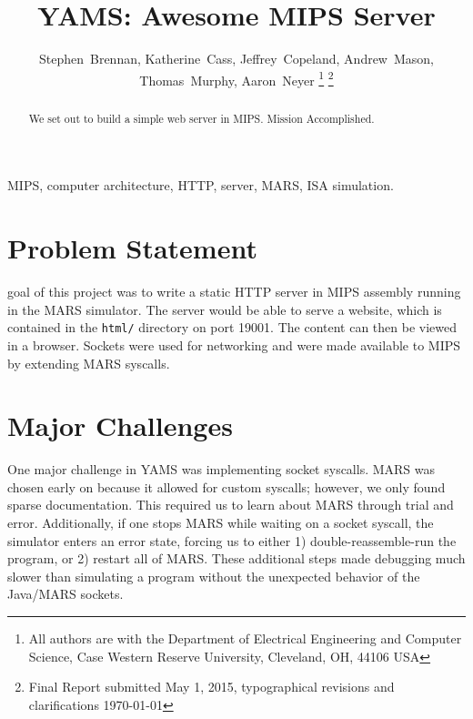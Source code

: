 \documentclass[journal,10pt]{IEEEtran}
\begin{document}
\title{YAMS: Awesome MIPS Server}

\author{
Stephen~Brennan,
Katherine~Cass,
Jeffrey~Copeland,
Andrew~Mason,
Thomas~Murphy,
Aaron~Neyer%
\thanks{All authors are with the Department of Electrical Engineering and Computer Science, Case Western Reserve University, Cleveland, OH, 44106 USA}%
\thanks{Final Report submitted May 1, 2015, typographical revisions and clarifications \today}
} %


%
{}

\maketitle

\begin{abstract}
We set out to build a simple web server in MIPS. Mission Accomplished.
\end{abstract}

\begin{IEEEkeywords}
MIPS, computer architecture, HTTP, server, MARS, ISA simulation.
\end{IEEEkeywords}


\section{Problem Statement}

 goal of this project was to write a static HTTP server in
MIPS assembly running in the MARS simulator. The server would be able to serve a
website, which is contained in the \texttt{html/} directory on port 19001. The
content can then be viewed in a browser. Sockets were used for networking and
were made available to MIPS by extending MARS syscalls.


\section{Major Challenges}

One major challenge in YAMS was implementing socket syscalls. MARS was chosen
early on because it allowed for custom syscalls; however, we only found sparse
documentation. This required us to learn about MARS through trial and error.
Additionally, if one stops MARS while waiting on a socket syscall, the simulator
enters an error state, forcing us to either 1) double-reassemble-run the
program, or 2) restart all of MARS. These additional steps made debugging much
slower than simulating a program without the unexpected behavior of the
Java/MARS sockets.
\end{document}
